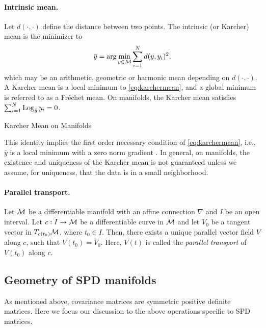 \paragraph{Intrinsic mean.} 
Let $d(\cdot,\cdot)$ define the distance between two points. The intrinsic (or Karcher) mean is the minimizer to
\begin{equation}\label{eq:karchermean}
\bar{y} = \arg \min_{y \in \mathcal{M}} \sum_{i=1}^{N} d(y,y_{i})^{2}, 
\end{equation}
which may be an arithmetic, geometric or harmonic mean depending on $d(\cdot,\cdot)$.
A Karcher mean is a local minimum to \eqref{eq:karchermean},
and a global minimum is referred to as a Fr\'{e}chet mean.
On manifolds, the Karcher mean satisfies $\sum_{i=1}^{N} \operatorname*{Log}_{\bar{y}}y_i =0$.
\begin{algorithm}
	\caption{Karcher Mean on Manifolds}\label{alg:karcher}
	\SetAlgoLined
	\DontPrintSemicolon
\end{algorithm}
This identity implies the first order necessary condition of \eqref{eq:karchermean},
i.e., $\bar{y}$ is a local minimum with a zero norm gradient \citep{karcher1977riemannian}.
In general, on manifolds, the existence and uniqueness of the Karcher mean is not guaranteed
unless we assume, for uniqueness, that the data is in a small neighborhood.

\paragraph{Parallel transport.} 
Let $\mathcal{M}$ be a differentiable manifold with an affine connection $\nabla$ and $I$ be an open interval.
Let $c:I \rightarrow \mathcal{M}$ be a differentiable curve in $\mathcal{M}$
and let $V_0$ be a tangent vector in $T_{c(t_0)}\mathcal{M}$, where $t_{0} \in I$. 
Then, there exists a unique parallel vector field $V$ along $c$, such that $V(t_0)=V_0$.
Here, $V(t)$ is called the \textit{parallel transport} of $V(t_0)$ along $c$. 

\subsection{Geometry of SPD manifolds}
As mentioned above, covariance matrices are symmetric positive definite matrices.
Here we focus our discussion to the above operations specific to SPD matrices.
 
